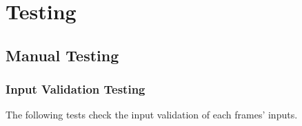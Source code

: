 \documentclass[./project-report/src/latex/project-report.tex]{subfiles}
\begin{document}
\maketitle

\clearpage
\section{Testing}

\subsection{Manual Testing}

\subsubsection{Input Validation Testing} %

The following tests check the input validation of each frames' inputs.
\end{document}
